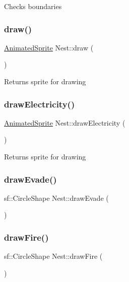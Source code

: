 Checks boundaries \mbox{\label{class_nest_a6e4950498b1c767c513e1a5fac4259e5}} 
\subsubsection{\texorpdfstring{draw()}{draw()}}
{\footnotesize\ttfamily \hyperlink{class_animated_sprite}{Animated\+Sprite} Nest\+::draw (\begin{DoxyParamCaption}{ }\end{DoxyParamCaption})}

Returns sprite for drawing \mbox{\label{class_nest_ad90f39c39a435c3cb2702880b624d254}} 
\subsubsection{\texorpdfstring{draw\+Electricity()}{drawElectricity()}}
{\footnotesize\ttfamily \hyperlink{class_animated_sprite}{Animated\+Sprite} Nest\+::draw\+Electricity (\begin{DoxyParamCaption}{ }\end{DoxyParamCaption})}

Returns sprite for drawing \mbox{\label{class_nest_a69a224e6296dadbeee744697d308259c}} 
\subsubsection{\texorpdfstring{draw\+Evade()}{drawEvade()}}
{\footnotesize\ttfamily sf\+::\+Circle\+Shape Nest\+::draw\+Evade (\begin{DoxyParamCaption}{ }\end{DoxyParamCaption})}

\mbox{\label{class_nest_a3118b2257f6864632abf907c42af94fd}} 
\subsubsection{\texorpdfstring{draw\+Fire()}{drawFire()}}
{\footnotesize\ttfamily sf\+::\+Circle\+Shape Nest\+::draw\+Fire (\begin{DoxyParamCaption}{ }\end{DoxyParamCaption})}

